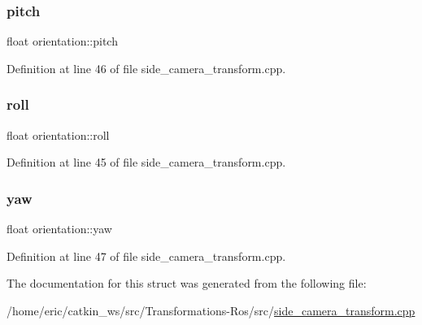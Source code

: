 \subsubsection{\texorpdfstring{pitch}{pitch}}
{\footnotesize\ttfamily float orientation\+::pitch}



Definition at line 46 of file side\+\_\+camera\+\_\+transform.\+cpp.

\mbox{\label{structorientation_a898c022734d840857dbd6a57b61779b9}} 
\subsubsection{\texorpdfstring{roll}{roll}}
{\footnotesize\ttfamily float orientation\+::roll}



Definition at line 45 of file side\+\_\+camera\+\_\+transform.\+cpp.

\mbox{\label{structorientation_a63e111fa80781bc0a939bff680c49a68}} 
\subsubsection{\texorpdfstring{yaw}{yaw}}
{\footnotesize\ttfamily float orientation\+::yaw}



Definition at line 47 of file side\+\_\+camera\+\_\+transform.\+cpp.



The documentation for this struct was generated from the following file\+:\begin{DoxyCompactItemize}
\item 
/home/eric/catkin\+\_\+ws/src/\+Transformations-\/\+Ros/src/\mbox{\hyperlink{side__camera__transform_8cpp}{side\+\_\+camera\+\_\+transform.\+cpp}}\end{DoxyCompactItemize}
